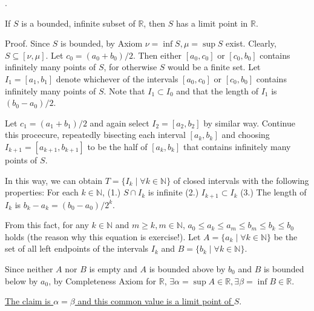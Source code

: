 \documentclass[8pt]{beamer}
\newcommand{\mbb}[1]{\mathbb{#1}}
\begin{document}
\begin{frame}{.}
    \begin{theorem} \label{th:4}
        If $S$ is a bounded, infinite subset of $\mbb{R}$, then $S$ has a limit point in $\mbb{R}$.

        \smallskip
        \text{}
        Proof.
        Since $S$ is bounded, by Axiom $\nu = \inf S, \mu = \sup S$ exist.
        Clearly, $S \subseteq [\nu, \mu]$.
        Let $c_0 = (a_0 + b_0)/2$.
        Then either $[a_0, c_0]$ or $[c_0, b_0]$ contains infinitely many points of $S$, for otherwise $S$ would be a finite set.
        Let $I_1 =[a_1, b_1]$ denote whichever of the intervals $[a_0, c_0]$ or $[c_0, b_0]$ contains infinitely many points of $S$.
        Note that $I_1 \subset I_0$ and that the length of $I_1$ is $(b_0 - a_0)/2$.

        Let $c_1 = (a_1 + b_1)/2$ and again select $I_2 = [a_2, b_2]$ by similar way.
        Continue this procecure, repeatedly bisecting each interval $[a_k, b_k]$ and choosing $I_{k+1} = [a_{k+1}, b_{k+1}]$ to be the half of $[a_k, b_k]$ that contains infinitely many points of $S$.

        In this way, we can obtain $T = \{I_k \mid \forall k \in \mbb{N}\}$ of closed intervals with the following properties:
        For each $k \in \mbb{N}$, (1.) $S \cap I_k$ is infinite (2.) $I_{k+1} \subset I_k$ (3.) The length of $I_k$ is $b_k - a_k = (b_0 - a_0)/ 2^k$.

        From this fact, for any $k \in \mbb{N}$ and $m \geq k, m \in \mbb{N}$, $a_0 \leq a_k \leq a_m \leq b_m \leq b_k \leq b_0$ holds (the reason why this equation is exercise!).
        Let $A = \{a_k \mid \forall k \in \mbb{N}\}$ be the set of all left endpoints of the intervals $I_k$ and $B = \{b_k \mid \forall k \in \mbb{N}\}$.

        Since neither $A$ nor $B$ is empty and $A$ is bounded above by $b_0$ and $B$ is bounded below by $a_0$, by Completeness Axiom for $\mbb{R}$, $\exists \alpha = \sup A \in \mbb{R}, \exists \beta = \inf B \in \mbb{R}$.

        \underline{The claim is $\alpha = \beta$ and this common value is a limit point of $S$}.
    \end{theorem}
\end{frame}
\end{document}
